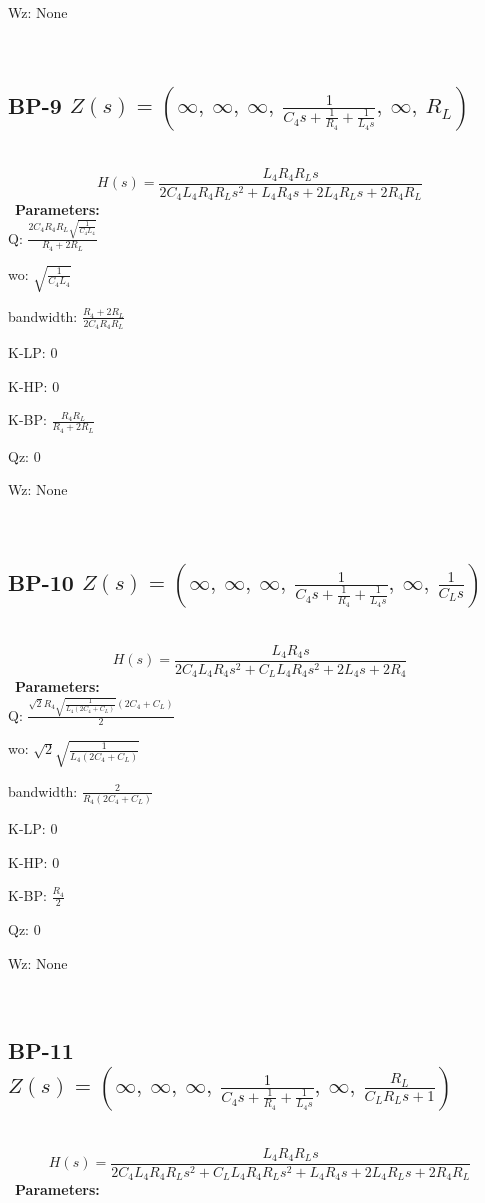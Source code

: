 \documentclass{article}
\begin{document}
Wz: $\text{None}$\ 

\ 

\subsection{BP-9 $Z(s) = \left( \infty, \  \infty, \  \infty, \  \frac{1}{C_{4} s + \frac{1}{R_{4}} + \frac{1}{L_{4} s}}, \  \infty, \  R_{L}\right)$ } \ 
\textbf{\[H(s) = \frac{L_{4} R_{4} R_{L} s}{2 C_{4} L_{4} R_{4} R_{L} s^{2} + L_{4} R_{4} s + 2 L_{4} R_{L} s + 2 R_{4} R_{L}}\] } \ 
\textbf{Parameters:}\\ 

Q: $\frac{2 C_{4} R_{4} R_{L} \sqrt{\frac{1}{C_{4} L_{4}}}}{R_{4} + 2 R_{L}}$\ 

wo: $\sqrt{\frac{1}{C_{4} L_{4}}}$\ 

bandwidth: $\frac{R_{4} + 2 R_{L}}{2 C_{4} R_{4} R_{L}}$\ 

K-LP: $0$\ 

K-HP: $0$\ 

K-BP: $\frac{R_{4} R_{L}}{R_{4} + 2 R_{L}}$\ 

Qz: $0$\ 

Wz: $\text{None}$\ 

\ 

\subsection{BP-10 $Z(s) = \left( \infty, \  \infty, \  \infty, \  \frac{1}{C_{4} s + \frac{1}{R_{4}} + \frac{1}{L_{4} s}}, \  \infty, \  \frac{1}{C_{L} s}\right)$ } \ 
\textbf{\[H(s) = \frac{L_{4} R_{4} s}{2 C_{4} L_{4} R_{4} s^{2} + C_{L} L_{4} R_{4} s^{2} + 2 L_{4} s + 2 R_{4}}\] } \ 
\textbf{Parameters:}\\ 

Q: $\frac{\sqrt{2} R_{4} \sqrt{\frac{1}{L_{4} \left(2 C_{4} + C_{L}\right)}} \left(2 C_{4} + C_{L}\right)}{2}$\ 

wo: $\sqrt{2} \sqrt{\frac{1}{L_{4} \left(2 C_{4} + C_{L}\right)}}$\ 

bandwidth: $\frac{2}{R_{4} \left(2 C_{4} + C_{L}\right)}$\ 

K-LP: $0$\ 

K-HP: $0$\ 

K-BP: $\frac{R_{4}}{2}$\ 

Qz: $0$\ 

Wz: $\text{None}$\ 

\ 

\subsection{BP-11 $Z(s) = \left( \infty, \  \infty, \  \infty, \  \frac{1}{C_{4} s + \frac{1}{R_{4}} + \frac{1}{L_{4} s}}, \  \infty, \  \frac{R_{L}}{C_{L} R_{L} s + 1}\right)$ } \ 
\textbf{\[H(s) = \frac{L_{4} R_{4} R_{L} s}{2 C_{4} L_{4} R_{4} R_{L} s^{2} + C_{L} L_{4} R_{4} R_{L} s^{2} + L_{4} R_{4} s + 2 L_{4} R_{L} s + 2 R_{4} R_{L}}\] } \ 
\textbf{Parameters:}\\ 
\end{document}
